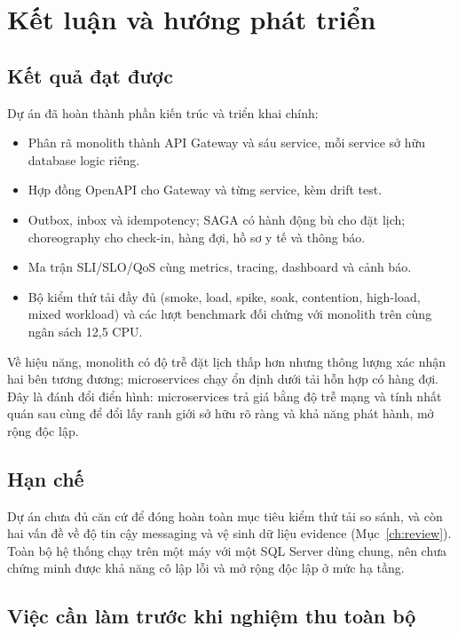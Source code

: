 \section{Kết luận và hướng phát triển}
\label{ch:conclusion}

\subsection{Kết quả đạt được}

Dự án đã hoàn thành phần kiến trúc và triển khai chính:

\begin{itemize}
  \item Phân rã monolith thành API Gateway và sáu service, mỗi service sở hữu database logic riêng.
  \item Hợp đồng OpenAPI cho Gateway và từng service, kèm drift test.
  \item Outbox, inbox và idempotency; SAGA có hành động bù cho đặt lịch; choreography cho check-in, hàng đợi, hồ sơ y tế và thông báo.
  \item Ma trận SLI/SLO/QoS cùng metrics, tracing, dashboard và cảnh báo.
  \item Bộ kiểm thử tải đầy đủ (smoke, load, spike, soak, contention, high-load, mixed workload) và các lượt benchmark đối chứng với monolith trên cùng ngân sách 12,5 CPU.
\end{itemize}

Về hiệu năng, monolith có độ trễ đặt lịch thấp hơn nhưng thông lượng xác nhận hai bên tương đương; microservices chạy ổn định dưới tải hỗn hợp có hàng đợi. Đây là đánh đổi điển hình: microservices trả giá bằng độ trễ mạng và tính nhất quán sau cùng để đổi lấy ranh giới sở hữu rõ ràng và khả năng phát hành, mở rộng độc lập.

\subsection{Hạn chế}

Dự án chưa đủ căn cứ để đóng hoàn toàn mục tiêu kiểm thử tải so sánh, và còn hai vấn đề về độ tin cậy messaging và vệ sinh dữ liệu evidence (Mục~\ref{ch:review}). Toàn bộ hệ thống chạy trên một máy với một SQL Server dùng chung, nên chưa chứng minh được khả năng cô lập lỗi và mở rộng độc lập ở mức hạ tầng.

\subsection{Việc cần làm trước khi nghiệm thu toàn bộ}

